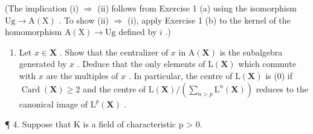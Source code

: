 (The implication (i) \(\Rightarrow\) (ii) follows from Exercise 1 (a) using the isomorphism \(\mathrm{Ug} \to \mathrm{A}(\mathrm{X})\) . To show (ii) \(\Rightarrow\) (i), apply Exercise 1 (b) to the kernel of the homomorphism \(\mathrm{A}(\mathrm{X}) \to \mathrm{Ug}\) defined by \(i\) .)

\begin{enumerate}
\def\labelenumi{\arabic{enumi}.}
\setcounter{enumi}{2}
\tightlist
\item
  Let \(x \in \mathbf{X}\) . Show that the centralizer of \(x\) in \(\mathrm{A}(\mathbf{X})\) is the subalgebra generated by \(x\) . Deduce that the only elements of \(\mathrm{L}(\mathbf{X})\) which commute with \(x\) are the multiples of \(x\) . In particular, the centre of \(\mathrm{L}(\mathbf{X})\) is (0) if \(\operatorname{Card}(\mathbf{X}) \geqslant 2\) and the centre of \(\mathrm{L}(\mathbf{X}) / \left( \sum_{n > p} \mathrm{L}^n(\mathbf{X}) \right)\) reduces to the canonical image of \(\mathrm{L}^p(\mathbf{X})\) .
\end{enumerate}


¶ 4. Suppose that K is a field of characteristic p \textgreater{} 0.

